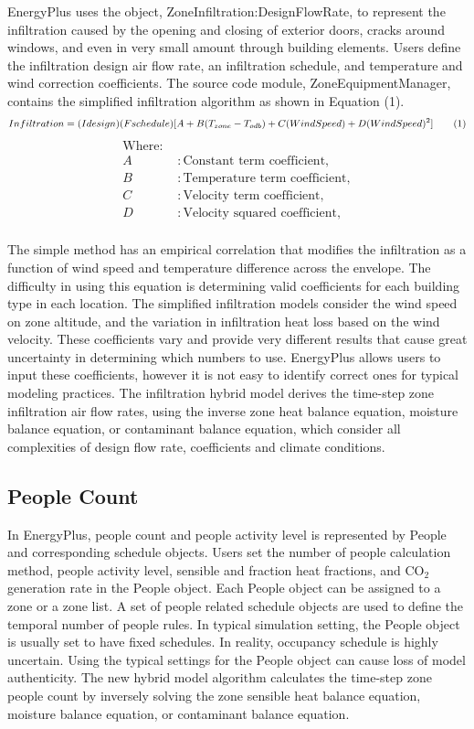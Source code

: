 \documentclass[11pt]{article}
\newcommand\numberthis{\addtocounter{equation}{1}\tag{\theequation}}
\begin{document}
EnergyPlus uses the object, ZoneInfiltration:DesignFlowRate, to represent the infiltration caused by the opening and closing of exterior doors, cracks around windows, and even in very small amount through building elements. Users define the infiltration design air flow rate, an infiltration schedule, and temperature and wind correction coefficients. The source code module, ZoneEquipmentManager, contains the simplified infiltration algorithm as shown in Equation (1).
\begin{align*}
Infiltration = (Idesign)(Fschedule)[A+B(T_{zone}-T_{odb})+C(WindSpeed)+D(WindSpeed)^{2}] \numberthis
\end{align*}
\begin{align*}
\text{Where: }\\
  A &: \text{Constant term coefficient}, \\
  B &: \text{Temperature term coefficient},\\
  C &: \text{Velocity term coefficient},\\
  D &: \text{Velocity squared coefficient},\\
\end{align*}

The simple method has an empirical correlation that modifies the infiltration as a function of wind speed and temperature difference across the envelope. The difficulty in using this equation is determining valid coefficients for each building type in each location. The simplified infiltration models consider the wind speed on zone altitude, and the variation in infiltration heat loss based on the wind velocity. These coefficients vary and provide very different results that cause great uncertainty in determining which numbers to use. EnergyPlus allows users to input these coefficients, however it is not easy to identify correct ones for typical modeling practices. 
The infiltration hybrid model derives the time-step zone infiltration air flow rates, using the inverse zone heat balance equation, moisture balance equation, or contaminant balance equation, which consider all complexities of design flow rate, coefficients and climate conditions. 

 
\subsection{People Count}
In EnergyPlus, people count and people activity level is represented by People and corresponding schedule objects. Users set the number of people calculation method, people activity level, sensible and fraction heat fractions, and CO$_2$ generation rate in the People object. Each People object can be assigned to a zone or a zone list. A set of people related schedule objects are used to define the temporal number of people rules. In typical simulation setting, the People object is usually set to have fixed schedules. In reality, occupancy schedule is highly uncertain. Using the typical settings for the People object can cause loss of model authenticity.
The new hybrid model algorithm calculates the time-step zone people count by inversely solving the zone sensible heat balance equation, moisture balance equation, or contaminant balance equation. 
\end{document}
